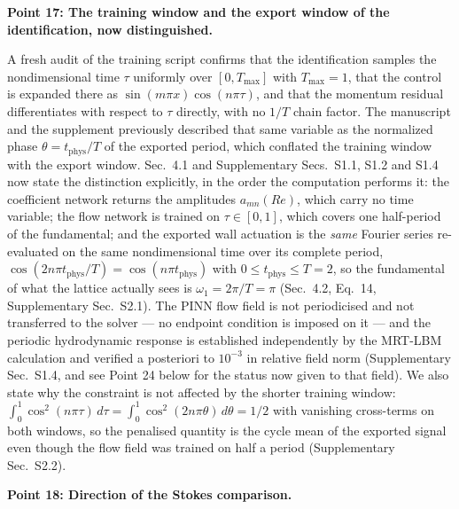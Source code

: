 \documentclass[11pt,a4paper]{article}
\begin{document}
\vspace{1em}

\noindent\textbf{Point 17: The training window and the export window of the
identification, now distinguished.}

A fresh audit of the training script confirms that the identification samples the
nondimensional time $\tau$ uniformly over $[0,T_{\max}]$ with
$T_{\max}=1$, that the control is expanded there as
$\sin(m\pi x)\cos(n\pi\tau)$, and that the momentum residual differentiates with
respect to $\tau$ directly, with no $1/T$ chain factor. The manuscript and the
supplement previously described that same variable as the normalized phase
$\theta=t_{\mathrm{phys}}/T$ of the exported period, which conflated the training
window with the export window. Sec.~4.1 and Supplementary Secs.~S1.1, S1.2 and S1.4
now state the
distinction explicitly, in the order the computation performs it: the coefficient
network returns the amplitudes $a_{mn}(Re)$, which carry no time variable; the
flow network is trained on $\tau\in[0,1]$, which covers one half-period of the
fundamental; and the exported wall actuation is the \emph{same} Fourier series
re-evaluated on the same nondimensional time over its complete period,
$\cos(2n\pi t_{\mathrm{phys}}/T)=\cos(n\pi t_{\mathrm{phys}})$ with
$0\le t_{\mathrm{phys}}\le T=2$, so the fundamental of what the lattice actually
sees is $\omega_1=2\pi/T=\pi$ (Sec.~4.2, Eq.~14, Supplementary Sec.~S2.1). The PINN
flow field is not periodicised and not transferred to the solver --- no endpoint
condition is imposed on it --- and the periodic hydrodynamic response is
established independently by the MRT-LBM calculation and verified a posteriori to
$10^{-3}$ in relative field norm (Supplementary Sec.~S1.4, and see Point 24 below
for the status now given to that field). We also state why the
constraint is not affected by the shorter training window:
$\int_0^1\cos^2(n\pi\tau)\,d\tau=\int_0^1\cos^2(2n\pi\theta)\,d\theta=1/2$ with
vanishing cross-terms on both windows, so the penalised quantity is the cycle
mean of the exported signal even though the flow field was trained on half a
period (Supplementary Sec.~S2.2).

\vspace{1em}

\noindent\textbf{Point 18: Direction of the Stokes comparison.}
\end{document}
